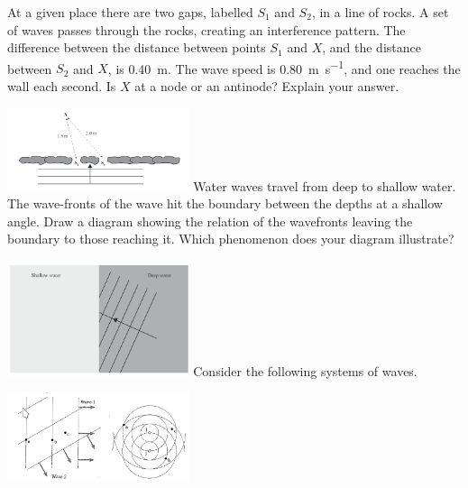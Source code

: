 \documentclass[a4paper]{exam}
\begin{document}
\begin{questions}
    \question At a given place there are two gaps, labelled $ S_1 $ and $S_2 $, in a line of rocks. A set of waves
              passes through the rocks, creating an interference pattern. The difference between the distance between
              points $ S_1 $ and $ X $, and the distance between $ S_2 $ and $ X $, is \SI{0.40}{\metre}. The wave
              speed is \SI{0.80}{\metre\per\second}, and one reaches the wall each second. Is $ X $ at a node or an antinode?
              Explain your answer.

              \includegraphics[width=0.4\textwidth]{nzqa20141}
    \question Water waves travel from deep to shallow water. The wave-fronts of the wave hit the boundary between the depths at
              a shallow angle. Draw a diagram showing the relation of the wavefronts leaving the boundary to those reaching it.
              Which phenomenon does your diagram illustrate?

              \includegraphics[width=0.4\textwidth]{nzqa20142}
    \question Consider the following systems of waves.

              \includegraphics[width=0.4\textwidth]{knight1789}
      \begin{parts}

\end{parts}
\end{questions}
\end{document}
